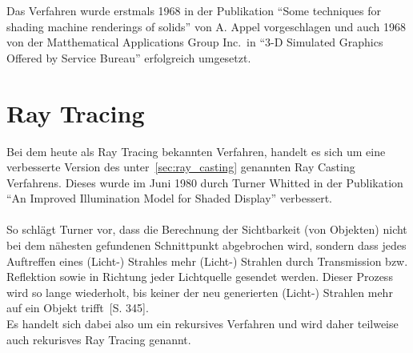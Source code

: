 Das Verfahren wurde erstmals 1968 in der Publikation ``Some techniques for
shading machine renderings of solids'' von A. Appel vorgeschlagen und auch 1968
von der Matthematical Applications Group Inc.\ in ``3-D Simulated Graphics
Offered by Service Bureau'' erfolgreich umgesetzt.

\newpage{}

\section{Ray Tracing}
\label{sec:ray_tracing}

Bei dem heute als Ray Tracing bekannten Verfahren, handelt es sich um eine
verbesserte Version des unter~\ref{sec:ray_casting} genannten Ray Casting
Verfahrens. Dieses wurde im Juni 1980 durch Turner Whitted in der Publikation
``An Improved Illumination Model for Shaded Display'' verbessert.\\
\\
So schlägt Turner vor, dass die Berechnung der Sichtbarkeit (von Objekten)
nicht bei dem nähesten gefundenen Schnittpunkt abgebrochen wird, sondern dass
jedes Auftreffen eines (Licht-) Strahles mehr (Licht-) Strahlen durch
Transmission bzw. Reflektion sowie in Richtung jeder Lichtquelle gesendet
werden. Dieser Prozess wird so lange wiederholt, bis keiner der neu generierten
(Licht-) Strahlen mehr auf ein Objekt trifft~\cite{whitted_improved_1980}[S.
345].\\
Es handelt sich dabei also um ein rekursives Verfahren und wird daher
teilweise auch rekurisves Ray Tracing genannt.


